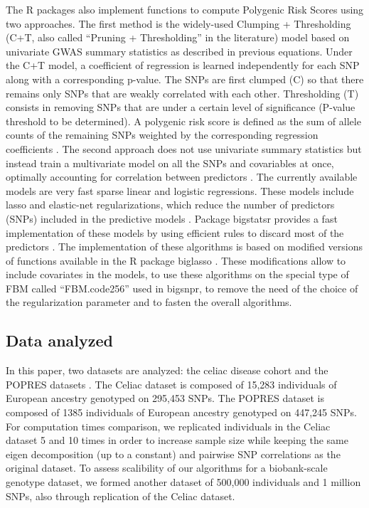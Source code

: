 \documentclass{bioinfo}
\begin{document}
\begin{methods}
The R packages also implement functions to compute Polygenic Risk Scores using two approaches. 
The first method is the widely-used Clumping + Thresholding (C+T, also called ``Pruning + Thresholding'' in the literature) model based on univariate GWAS summary statistics as described in previous equations. Under the C+T model, a coefficient of regression is learned independently for each SNP along with a corresponding p-value. The SNPs are first clumped (C) so that there remains only SNPs that are weakly correlated with each other. Thresholding (T) consists in removing SNPs that are under a certain level of significance (P-value threshold to be determined). A polygenic risk score is defined as the sum of allele counts of the remaining SNPs weighted by the corresponding regression coefficients \cite[]{Chatterjee2013,Dudbridge2013,Golan2014}. 
The second approach does not use univariate summary statistics but instead train a multivariate model on all the SNPs and covariables at once, optimally accounting for correlation between predictors \cite[]{Abraham2012}. The currently available models are very fast sparse linear and logistic regressions. These models include lasso and elastic-net regularizations, which reduce the number of  predictors (SNPs) included in the predictive models \cite[]{Friedman2010,Tibshirani1996,Zou2005}. Package bigstatsr provides a fast implementation of these models by using efficient rules to discard most of the predictors \cite[]{Tibshirani2012}. The implementation of these algorithms is based on modified versions of functions available in the R package biglasso \cite[]{Zeng2017}. These modifications allow to include covariates in the models, to use these algorithms on the special type of FBM called ``FBM.code256'' used in bigsnpr, to remove the need of the choice of the regularization parameter and to fasten the overall algorithms.

\subsection{Data analyzed}

In this paper, two datasets are analyzed: the celiac disease cohort and the POPRES datasets \cite[]{Dubois2010,Nelson2008}. The Celiac dataset is composed of 15,283 individuals of European ancestry genotyped on 295,453 SNPs. The POPRES dataset is composed of 1385 individuals of European ancestry genotyped on 447,245 SNPs.
For computation times comparison, we replicated individuals in the Celiac dataset 5 and 10 times in order to increase sample size while keeping the same {\color{red} eigen decomposition (up to a constant) and pairwise SNP correlations} as the original dataset. To assess scalibility of our algorithms for a biobank-scale genotype dataset, we formed another dataset of 500,000 individuals and 1 million SNPs, also through replication of the Celiac dataset. \label{sec:rep}


\end{methods}
\end{document}
